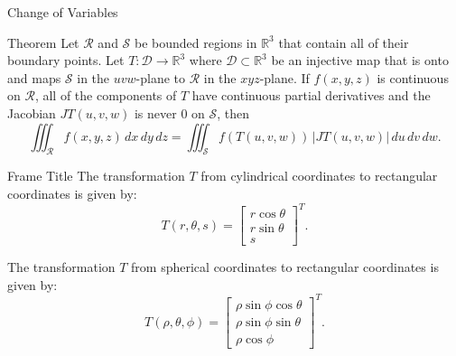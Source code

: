 \documentclass[aspectratio=169, UTF8]{ctexbeamer}
\begin{document}
\begin{frame}{Change of Variables}
    \begin{block}{Theorem}
        Let $\mathcal{R}$ and $\mathcal{S}$ be bounded regions in $\mathbb{R}^3$ that contain all of their boundary points. Let $T : \mathcal{D} \rightarrow \mathbb{R}^3$ where $\mathcal{D} \subset \mathbb{R}^3$ be an injective map that is onto and maps $\mathcal{S}$ in the $uvw$-plane to $\mathcal{R}$ in the $xyz$-plane. If $f(x, y, z)$ is continuous on $\mathcal{R}$, all of the components of $T$ have continuous partial derivatives and the Jacobian $JT(u, v, w)$ is never $0$ on $\mathcal{S}$, then
\[
\iiint_{\mathcal{R}} f(x, y, z) \, dx \, dy \, dz = \iiint_{\mathcal{S}} f(T(u, v, w)) \, \left| JT(u, v, w) \right| \, du \, dv \, dw.
\]
    \end{block}
\end{frame}
\begin{frame}{Frame Title}
    The transformation \(T\) from cylindrical coordinates to rectangular coordinates is given by:
\[ T(r, \theta,s) = \begin{bmatrix} r \cos \theta \\ r \sin \theta \\ s \end{bmatrix}^T. \]

The transformation \(T\) from spherical coordinates to rectangular coordinates is given by:
\[ T(\rho, \theta, \phi) = \begin{bmatrix} \rho \sin \phi \cos \theta \\ \rho \sin \phi \sin \theta \\ \rho \cos \phi \end{bmatrix}^T. \]
\end{frame}
\end{document}
